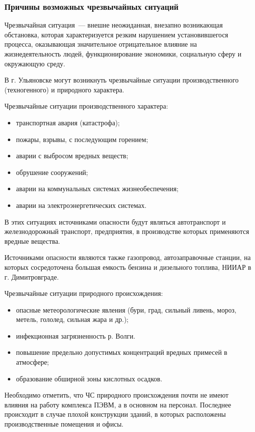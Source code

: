 \subsubsection{Причины возможных чрезвычайных ситуаций}
Чрезвычайная ситуация~--- внешне неожиданная, внезапно возникающая обстановка, которая характеризуется резким нарушением установившегося процесса, оказывающая значительное отрицательное влияние на жизнедеятельность людей, функционирование экономики, социальную сферу и окружающую среду.

В г. Ульяновске могут возникнуть чрезвычайные ситуации производственного (техногенного) и природного характера.

Чрезвычайные ситуации производственного характера:
\begin{itemize}
  \item транспортная авария (катастрофа);
  \item пожары, взрывы, с последующим горением;
  \item аварии с выбросом вредных веществ;
  \item обрушение сооружений;
  \item аварии на коммунальных системах жизнеобеспечения;
  \item аварии на электроэнергетических системах.
\end{itemize}

В этих ситуациях источниками опасности будут являться автотранспорт и железнодорожный транспорт, предприятия, в производстве которых применяются вредные вещества.

Источниками опасности являются также газопровод, автозаправочные станции, на которых сосредоточена большая емкость бензина и дизельного топлива, НИИАР в г. Димитровграде.

Чрезвычайные ситуации природного происхождения:
\begin{itemize}
  \item опасные метеорологические явления (бури, град, сильный ливень, мороз, метель, гололед, сильная жара и др.);
  \item инфекционная загрязненность р. Волги.
  \item повышение предельно допустимых концентраций вредных примесей в атмосфере;
  \item образование обширной зоны кислотных осадков.
\end{itemize}

Необходимо отметить, что ЧС природного происхождения почти не имеют влияния на работу комплекса ПЭВМ, а в основном на персонал.
Последнее происходит в случае плохой конструкции зданий, в которых расположены производственные помещения и офисы.

